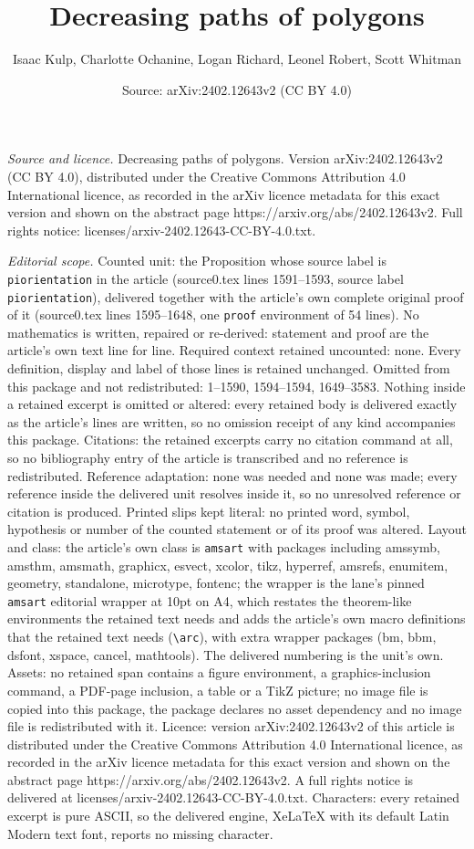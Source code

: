 \documentclass[10pt,a4paper]{amsart}
\title[Decreasing paths of polygons]{Decreasing paths of polygons}
\author{Isaac Kulp, Charlotte Ochanine, Logan Richard, Leonel Robert, Scott Whitman}
\date{Source: arXiv:2402.12643v2 (CC BY 4.0)}
\begin{document}
\maketitle

\noindent\emph{Source and licence.} Decreasing paths of polygons. Version arXiv:2402.12643v2 (CC BY 4.0), distributed under the Creative Commons Attribution 4.0 International licence, as recorded in the arXiv licence metadata for this exact version and shown on the abstract page https://arxiv.org/abs/2402.12643v2. Full rights notice: licenses/arxiv-2402.12643-CC-BY-4.0.txt.\par\smallskip

\noindent\textit{Editorial scope.} Counted unit: the Proposition whose source label is \texttt{piorientation} in the article (source0.tex lines 1591--1593, source label \texttt{piorientation}), delivered together with the article's own complete original proof of it (source0.tex lines 1595--1648, one \texttt{proof} environment of 54 lines). No mathematics is written, repaired or re-derived: statement and proof are the article's own text line for line. Required context retained uncounted: none. Every definition, display and label of those lines is retained unchanged. Omitted from this package and not redistributed: 1--1590, 1594--1594, 1649--3583. Nothing inside a retained excerpt is omitted or altered: every retained body is delivered exactly as the article's lines are written, so no omission receipt of any kind accompanies this package. Citations: the retained excerpts carry no citation command at all, so no bibliography entry of the article is transcribed and no reference is redistributed. Reference adaptation: none was needed and none was made; every reference inside the delivered unit resolves inside it, so no unresolved reference or citation is produced. Printed slips kept literal: no printed word, symbol, hypothesis or number of the counted statement or of its proof was altered. Layout and class: the article's own class is \texttt{amsart} with packages including amssymb, amsthm, amsmath, graphicx, esvect, xcolor, tikz, hyperref, amsrefs, enumitem, geometry, standalone, microtype, fontenc; the wrapper is the lane's pinned \texttt{amsart} editorial wrapper at 10pt on A4, which restates the theorem-like environments the retained text needs and adds the article's own macro definitions that the retained text needs (\texttt{\textbackslash arc}), with extra wrapper packages (bm, bbm, dsfont, xspace, cancel, mathtools). The delivered numbering is the unit's own. Assets: no retained span contains a figure environment, a graphics-inclusion command, a PDF-page inclusion, a table or a TikZ picture; no image file is copied into this package, the package declares no asset dependency and no image file is redistributed with it. Licence: version arXiv:2402.12643v2 of this article is distributed under the Creative Commons Attribution 4.0 International licence, as recorded in the arXiv licence metadata for this exact version and shown on the abstract page https://arxiv.org/abs/2402.12643v2. A full rights notice is delivered at licenses/arxiv-2402.12643-CC-BY-4.0.txt. Characters: every retained excerpt is pure ASCII, so the delivered engine, XeLaTeX with its default Latin Modern text font, reports no missing character.
\end{document}
